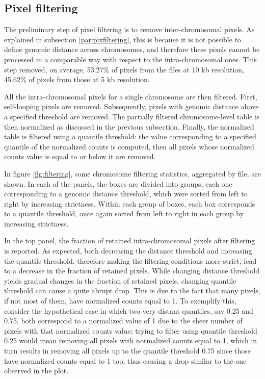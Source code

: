 \subsection{Pixel filtering}

The preliminary step of pixel filtering is to remove inter-chromosomal pixels. As explained in subsection \ref{par:pixfiltering}, this is because it is not possible to define genomic distance across chromosomes, and therefore these pixels cannot be processed in a comparable way with respect to the intra-chromosomal ones. This step removed, on average, 53.27\% of pixels from the files at 10 kb resolution, 45.62\% of pixels from those at 5 kb resolution.

All the intra-chromosomal pixels for a single chromosome are then filtered. First, self-looping pixels are removed. Subsequently, pixels with genomic distance above a specified threshold are removed. The partially filtered chromosome-level table is then normalized as discussed in the previous subsection. Finally, the normalized table is filtered using a quantile threshold: the value corresponding to a specified quantile of the normalized counts is computed, then all pixels whose normalized counts value is equal to or below it are removed.

In figure \ref{fig:filtering}, some chromosome filtering statistics, aggregated by file, are shown. In each of the panels, the boxes are divided into groups, each one corresponding to a genomic distance threshold, which were sorted from left to right by increasing strictness. Within each group of boxes, each box corresponds to a quantile threshold, once again sorted from left to right in each group by increasing strictness.

In the top panel, the fraction of retained intra-chromosomal pixels after filtering is reported. As expected, both decreasing the distance threshold and increasing the quantile threshold, therefore making the filtering conditions more strict, lead to a decrease in the fraction of retained pixels. While changing distance threshold yields gradual changes in the fraction of retained pixels, changing quantile threshold can cause a quite abrupt drop. This is due to the fact that many pixels, if not most of them, have normalized counts equal to 1. To exemplify this, consider the hypothetical case in which two very distant quantiles, say 0.25 and 0.75, both correspond to a normalized value of 1 due to the sheer number of pixels with that normalized counts value; trying to filter using quantile threshold 0.25 would mean removing all pixels with normalized counts equal to 1, which in turn results in removing all pixels up to the quantile threshold 0.75 since those have normalized counts equal to 1 too, thus causing a drop similar to the one observed in the plot.

